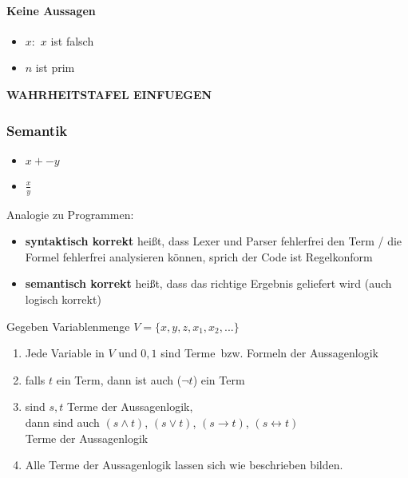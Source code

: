 \paragraph{Keine Aussagen}
\begin{itemize}
\item \glqq $x:$ $x$ ist falsch\grqq{}
\item \glqq $n$ ist prim\grqq{}
\end{itemize}
%
\textbf{WAHRHEITSTAFEL EINFUEGEN}
\subsubsection{Semantik}
\begin{itemize}
\item \( x + - y \)
\item \( \frac{x}{y} \)
\end{itemize}
Analogie zu Programmen:
\begin{itemize}
\item \textbf{syntaktisch korrekt} heißt, dass Lexer und Parser fehlerfrei den Term / die Formel fehlerfrei analysieren können, sprich der Code ist Regelkonform
\item \textbf{semantisch korrekt} heißt, dass das richtige Ergebnis geliefert wird (auch logisch korrekt)
\end{itemize}
%
\begin{defi}
Gegeben Variablenmenge $V = \{ x,y,z,x_1,x_2, ...\} $
\begin{enumerate}
\item Jede Variable in $V$ und $0,1$ sind \glq Terme\grq\ bzw. Formeln der Aussagenlogik
\item falls $t$ ein Term, dann ist auch ($\neg t$) ein Term
\item sind $s,t$ Terme der Aussagenlogik, \\
dann sind auch $(s \land t)$, $(s \lor t)$, $(s\rightarrow t)$, $(s\leftrightarrow t)$ \\
Terme der Aussagenlogik
\item Alle Terme der Aussagenlogik lassen sich wie beschrieben bilden.
\end{enumerate}
\end{defi}
%
